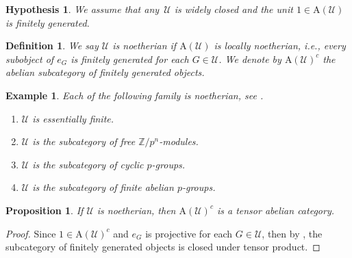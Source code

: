\documentclass[11pt,a4paper]{amsart}
\numberwithin{equation}{section} \theoremstyle{plain}
\newtheorem{prop}[lem]{Proposition}
\newtheorem{hyp}[lem]{Hypothesis}
\newtheorem{definition}[lem]{Definition}
\newtheorem{Ex}[lem]{Example}
\newenvironment{df}{\begin{definition}\rm}{\end{definition}}
\newenvironment{ex}{\begin{Ex}\rm}{\end{Ex}}
\begin{document}
\begin{hyp} We assume that any~$\mathcal{U}$ is widely closed and the unit $\mathrm{1}\in \mathrm{A}(\mathcal{U})$  is finitely generated.
\end{hyp}
\begin{df} We say $\mathcal{U}$ is noetherian if $\mathrm{A}(\mathcal{U})$ is locally noetherian, i.e., every subobject of $e_{G}$ is finitely generated for each $G\in \mathcal{U}$. We denote by $\mathrm{A}(\mathcal{U})^{c}$ the  abelian subcategory of finitely generated objects.
\end{df}

\begin{ex} Each of the following family is noetherian, see \cite[Lemma 11.9, Theorem 13.4]{PS22}.
\begin{enumerate}
\item $\mathcal{U}$ is essentially finite.

\item $\mathcal{U}$ is the subcategory of free $\mathbb{Z}/p^{n}$-modules.

\item $\mathcal{U}$ is the subcategory of cyclic $p$-groups.

\item $\mathcal{U}$ is the subcategory of finite abelian $p$-groups.
\end{enumerate}
\end{ex}

\begin{prop}\label{prop4.4} If $\mathcal{U}$ is noetherian, then $\mathrm{A}(\mathcal{U})^{c}$ is a tensor  abelian category.
\end{prop}
\begin{proof}Since $\mathrm{1}\in \mathrm{A}(\mathcal{U})^{c}$ and $e_{G}$ is projective for each $G\in \mathcal{U}$, then by \cite[Proposition 8.7]{PS22}, the subcategory of finitely generated objects is closed under tensor product.
\end{proof}
\end{document}
